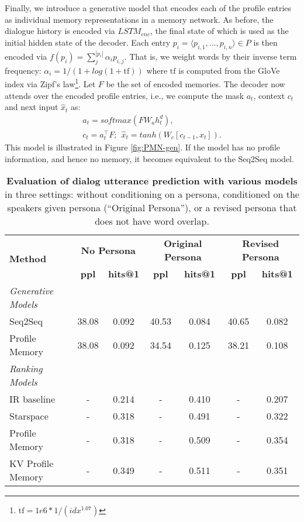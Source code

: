 \documentclass[11pt,a4paper]{article}
\begin{document}
Finally, we introduce a generative model that encodes each of the profile entries as individual memory representations in a memory network. As before, the dialogue history is encoded via $LSTM_{enc}$, the final state of which is used as the initial hidden state of the decoder. Each entry $p_i = \langle p_{i,1}, \ldots, p_{i,n} \rangle \in P$ is then encoded via $f(p_i) = \sum_j^{|p_i|} \alpha_i p_{i,j}$. That is, we weight words by their inverse term frequency: $\alpha_i = 1 / (1 + log(1 + \text{tf}))$ where $\text{tf}$ is computed from the GloVe index via Zipf's law\footnote{$\text{tf} = 1e6 * 1/(idx^{1.07})$}. Let $F$ be the set of encoded memories. The decoder now attends over the encoded profile entries, i.e., we compute the mask $a_t$, context $c_t$ and next input $\hat{x}_t$ as:
\begin{eqnarray*}
a_t = softmax(F W_a h^d_t), \\
c_t = a_t^\intercal F; ~~\hat{x}_t = tanh(W_c [c_{t-1}, x_t]).
\end{eqnarray*}
\ifarxiv
This model is illustrated in Figure \ref{fig:PMN-gen}.
\fi
If the model has no profile information, and hence no memory, it becomes equivalent to the Seq2Seq model.
 \begin{table*}[t]
  \centering
  \begin{tabular}{lcccccc}
  \toprule
  \multirow{2}{*}{\textbf{Method}} & \multicolumn{2}{c}{\textbf{No Persona}} & \multicolumn{2}{c}{\textbf{Original Persona}} & \multicolumn{2}{c}{\textbf{Revised Persona}}\\
   & \textbf{ppl} & \textbf{hits@1} & \textbf{ppl} & \textbf{hits@1}  &\textbf{ppl} & \textbf{hits@1} 
   \\
  \midrule
  {\em Generative Models} \\
  Seq2Seq        & 38.08 & 0.092 & 40.53 & 0.084 &  40.65 & 0.082 \\
  Profile Memory & 38.08 & 0.092 & 34.54 & 0.125 & 38.21 & 0.108 \\
  \midrule
  {\em Ranking Models} \\
    IR baseline        & - & 0.214 &  - & 0.410  & - &  0.207  \\
  Starspace          & - & 0.318 &   - & 0.491  & - & 0.322   \\
 Profile Memory    & - & 0.318  &  - & 0.509  &  - & 0.354  \\
 KV Profile Memory & - & 0.349  &  - & 0.511  &  - & 0.351   \\
\bottomrule
  \end{tabular}
  \caption{{\bf Evaluation of dialog utterance prediction with various models} in three settings: without conditioning on a persona, conditioned on the speakers given persona (``Original Persona''),  or a revised persona that does not have word overlap.      \label{tab:all-results}
     }
\end{table*}
\end{document}
